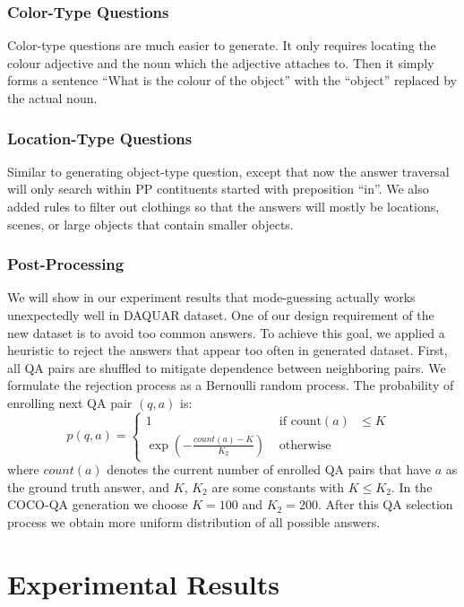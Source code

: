 \documentclass{article}
\renewcommand{\#}[1]{\textbf{#1}}
\begin{document}
\subsubsection{Color-Type Questions}
Color-type questions are much easier to generate. It only requires locating the colour adjective and the noun which the adjective attaches to. Then it simply forms a sentence ``What is the colour of the object'' with the ``object'' replaced by the actual noun.

\subsubsection{Location-Type Questions}
Similar to generating object-type question, except that now the answer traversal will only search within PP contituents started with preposition ``in''. We also added rules to filter out clothings so that the answers will mostly be locations, scenes, or large objects that contain smaller objects.

\subsubsection{Post-Processing}
We will show in our experiment results that mode-guessing actually works unexpectedly well in DAQUAR dataset. One of our design requirement of the new dataset is to avoid too common answers.  To achieve this goal, we applied a heuristic to reject the answers that appear too often in generated dataset. First, all QA pairs are shuffled to mitigate dependence between neighboring pairs. We formulate the rejection process as a Bernoulli random process. The probability of enrolling next QA pair $(q, a)$ is:
\begin{equation}
p(q, a) = \left\{ \begin{array}{cl}
1 &\mbox{ if count$(a)$ $\le K$ } \\
\exp\left(-\frac{count(a) - K}{K_2}\right) &\mbox{ otherwise }
\end{array} \right.
\end{equation}
where $count(a)$ denotes the current number of enrolled QA pairs that have $a$ as the ground truth answer, and $K$, $K_2$ are some constants with $K \le K_2$. In the COCO-QA generation we choose $K = 100$ and $K_2 = 200$. After this QA selection process we obtain more uniform distribution of all possible answers.
\section{Experimental Results}
\end{document}
